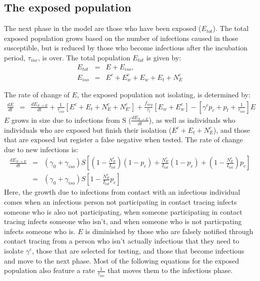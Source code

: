 \documentclass[notitlepage, superscriptaddress]{revtex4-2}
\begin{document}
\subsection{The exposed population}
The next phase in the model are those who have been exposed ($E_{tot}$). The total exposed population grows based on the number of infections caused in those susceptible, but is reduced by those who become infectious after the incubation period, $\tau_{inc}$, is over. The total population $E_{tot}$ is given by:
\begin{eqnarray}
\label{E:Etot}
E_{tot} &=& E + E_{iso}, \\ 
%
E_{iso} &=& E^{c} + E^{c}_{w} + E_{w} + E_{t} + N^{c}_{E}
\end{eqnarray}

The rate of change of $E$, the exposed population not isolating, is determined by:
\begin{eqnarray}
\label{E:dE}
\frac{dE}{dt} &=& \frac{dE_{S \rightarrow E}}{dt}  + \frac{1}{\tau_{iso}}[E^{c} + E_{t} + N^{c}_{E} + N^{c}_{E'}] + \frac{f_{neg}}{\tau_{t}}[E_{w} + E^{c}_{w}] -  [\gamma^{c} p_{c} +p_{t} + \frac{1}{\tau_{inc}}] E
\end{eqnarray}
%
$E$ grows in size due to infections from S ($\frac{dE_{S \rightarrow E}}{dt}$), as well as individuals who individuals who are exposed but finish their isolation ($E^{c} + E_{t} + N^{c}_{E}$), and those that are exposed but register a false negative when tested. The rate of change due to new infections is:
%
\begin{eqnarray}
\label{E:dE}
\frac{dE_{S \rightarrow E}}{dt} &=& (\gamma_{0} + \gamma_{iso})S \left[ (1 - \frac{N^{c}_{E}}{I_{tot}})  (1 - p_c) + \frac{N^{c}_{E}}{I_{tot}}(1 - p_c) + (1 - \frac{N^{c}_{E}}{I_{tot}}) p_c \right] \\ 
&=& (\gamma_{0} + \gamma_{iso})S \left[ 1 - \frac{N^{c}_{E}}{I_{tot}}  p_c \right]
\end{eqnarray}
 Here, the growth due to infections from contact with an infectious individual comes when an infectious person not participating in contact tracing infects someone who is also not participating, when someone participating in contact tracing infects someone who isn't, and when someone who is not particpating infects someone who is. $E$ is diminished by those who are falsely notified through contact tracing from a person who isn't actually infectious that they need to isolate $\gamma^{c}$, those that are selected for testing, and those that become infectious and move to the next phase. Most of the following equations for the exposed population also feature a rate $\frac{1}{\tau_{inc}}$ that moves them to the infectious phase.
\end{document}

